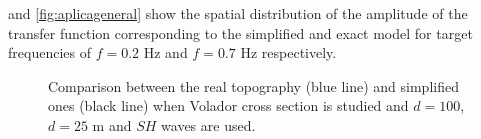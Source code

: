 \documentclass[11pt,letterpaper]{article}
\begin{document}

 and \cref{fig:aplicageneral} show the spatial distribution of the amplitude of the transfer function corresponding to the simplified and exact model for target frequencies of $f=0.2$ Hz and  $f=0.7$ Hz respectively.

\begin{figure}[H]
	\centering
	\caption{Comparison between the real topography  (blue line) and simplified  ones (black line) when Volador cross section is studied and $d = 100$,   $d = 25$ m and $SH$ waves are used.}
	\label{fig:FTNut}
\end{figure}
\end{document}
